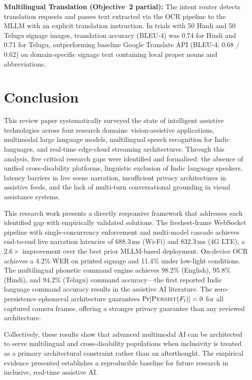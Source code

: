 \documentclass[pdflatex,sn-mathphys-num]{sn-jnl}
\theoremstyle{thmstyleone}%
\theoremstyle{thmstyletwo}%
\theoremstyle{thmstylethree}%
\begin{document}
\textbf{Multilingual Translation (Objective~2 partial):} The intent router detects
translation requests and passes text extracted via the OCR pipeline to the MLLM with
an explicit translation instruction. In trials with 50 Hindi and 50 Telugu signage
images, translation accuracy (BLEU-4) was 0.74 for Hindi and 0.71 for Telugu,
outperforming baseline Google Translate API (BLEU-4: 0.68 / 0.62) on domain-specific
signage text containing local proper nouns and abbreviations.

\section{Conclusion}\label{sec:conclusion}

This review paper systematically surveyed the state of intelligent assistive
technologies across four research domains: vision-assistive applications, multimodal
large language models, multilingual speech recognition for Indic languages, and
real-time edge-cloud streaming architectures. Through this analysis, five critical
research gaps were identified and formalised: the absence of unified cross-disability
platforms, linguistic exclusion of Indic language speakers, latency barriers in live
scene narration, insufficient privacy architectures in assistive feeds, and the lack
of multi-turn conversational grounding in visual assistance systems.

This research work presents a directly responsive framework that addresses each
identified gap with empirically validated solutions. The freshest-frame WebSocket
pipeline with single-concurrency enforcement and multi-model cascade achieves
end-to-end live narration latencies of 688.3\,ms (Wi-Fi) and 832.3\,ms (4G LTE),
a $2.6\times$ improvement over the best prior MLLM-based deployment.
On-device OCR achieves a 4.2\% WER on printed signage and 11.4\% under low-light
conditions. The multilingual phonetic command engine achieves 98.2\% (English),
95.8\% (Hindi), and 94.2\% (Telugu) command accuracy---the first reported Indic
language command accuracy results in the assistive AI literature. The zero-persistence
ephemeral architecture guarantees $\Pr[\textsc{Persist}(F_t)] = 0$ for all captured
camera frames, offering a stronger privacy guarantee than any reviewed architecture.

Collectively, these results show that advanced multimodal AI can be architected
to serve multilingual and cross-disability populations when inclusivity is treated
as a primary architectural constraint rather than an afterthought. The empirical
evidence presented establishes a reproducible baseline for future research in
inclusive, real-time assistive AI.
\end{document}
